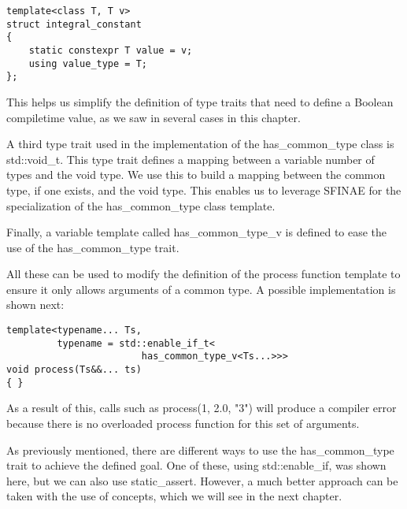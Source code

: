 \begin{lstlisting}[style=styleCXX]
template<class T, T v>
struct integral_constant
{
	static constexpr T value = v;
	using value_type = T;
};
\end{lstlisting}

This helps us simplify the definition of type traits that need to define a Boolean compiletime value, as we saw in several cases in this chapter.

A third type trait used in the implementation of the has\_common\_type class is std::void\_t. This type trait defines a mapping between a variable number of types and the void type. We use this to build a mapping between the common type, if one exists, and the void type. This enables us to leverage SFINAE for the specialization of the has\_common\_type class template.

Finally, a variable template called has\_common\_type\_v is defined to ease the use of the has\_common\_type trait.

All these can be used to modify the definition of the process function template to ensure it only allows arguments of a common type. A possible implementation is shown next:

\begin{lstlisting}[style=styleCXX]
template<typename... Ts,
		 typename = std::enable_if_t<
						has_common_type_v<Ts...>>>
void process(Ts&&... ts)
{ }
\end{lstlisting}

As a result of this, calls such as process(1, 2.0, "3") will produce a compiler error because there is no overloaded process function for this set of arguments.

As previously mentioned, there are different ways to use the has\_common\_type trait to achieve the defined goal. One of these, using std::enable\_if, was shown here, but we can also use static\_assert. However, a much better approach can be taken with the use of concepts, which we will see in the next chapter.








